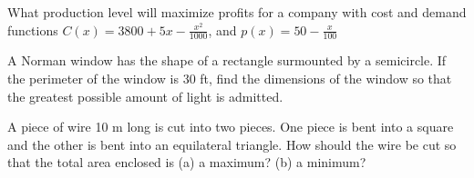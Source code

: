 \documentclass[10pt,letterpaper]{article}
\begin{document}
    What production level will maximize profits for a company with cost and demand functions $\displaystyle C(x) = 3800 + 5x -\frac{x^2}{1000}$, and $\displaystyle p(x) = 50-\frac{x}{100}$

   A Norman window has the shape of a rectangle surmounted by a semicircle.  If the perimeter of the window is 30 ft, find the dimensions of the window so that the greatest possible amount of light is admitted.

   A piece of wire 10 m long is cut into two pieces.  One piece is bent into a square and the other is bent into an equilateral triangle.  How should the wire be cut so that the total area enclosed is (a) a maximum? (b) a minimum?
\end{document}
